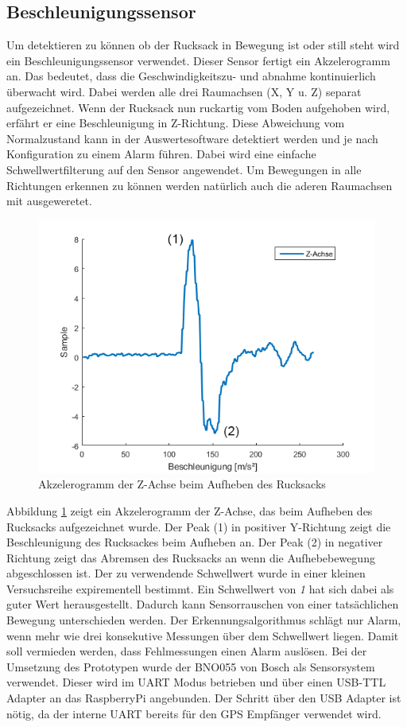 \documentclass{sigchi}
\begin{document}
\subsection{Beschleunigungssensor}
Um detektieren zu können ob der Rucksack in Bewegung ist oder
still steht wird ein Beschleunigungssensor verwendet. Dieser
Sensor fertigt ein Akzelerogramm an. Das bedeutet, dass die
Geschwindigkeitszu- und abnahme kontinuierlich überwacht wird.
Dabei werden alle drei Raumachsen (X, Y u. Z) separat aufgezeichnet.
Wenn der Rucksack nun ruckartig vom Boden aufgehoben wird, erfährt er
eine Beschleunigung in Z-Richtung. Diese Abweichung vom
Normalzustand kann in der Auswertesoftware detektiert werden
und je nach Konfiguration zu einem Alarm führen. Dabei wird 
eine einfache Schwellwertfilterung auf den Sensor angewendet.
Um Bewegungen in alle Richtungen erkennen zu können werden natürlich
auch die aderen Raumachsen mit ausgeweretet.

\begin{figure}
\centering
  \includegraphics[width=0.9\columnwidth]{fig/accel_z.png}
  \caption{Akzelerogramm der Z-Achse beim Aufheben des Rucksacks}
  \label{fig:accel_z}
\end{figure}

Abbildung \ref{fig:accel_z} zeigt ein Akzelerogramm der Z-Achse,
das beim Aufheben des Rucksacks aufgezeichnet wurde. Der Peak (1)
in positiver Y-Richtung zeigt die Beschleunigung des Rucksackes
beim Aufheben an. Der Peak (2) in negativer Richtung zeigt das
Abremsen des Rucksacks an wenn die Aufhebebewegung abgeschlossen
ist. Der zu verwendende Schwellwert wurde in einer kleinen
Versuchsreihe expirementell bestimmt. Ein Schwellwert von \textit{1}
hat sich dabei als guter Wert herausgestellt. Dadurch kann
Sensorrauschen von einer tatsächlichen Bewegung unterschieden
werden. Der Erkennungsalgorithmus schlägt nur Alarm, wenn mehr
wie drei konsekutive Messungen über dem Schwellwert liegen. Damit
soll vermieden werden, dass Fehlmessungen einen Alarm auslösen.
Bei der Umsetzung des Prototypen wurde der BNO055 \cite{Bosch:BNO055}
von Bosch als Sensorsystem verwendet. Dieser wird im UART Modus
betrieben und über einen USB-TTL Adapter an das RaspberryPi
angebunden. Der Schritt über den USB Adapter ist nötig, da der
interne UART bereits für den GPS Empfänger verwendet wird.
\end{document}

